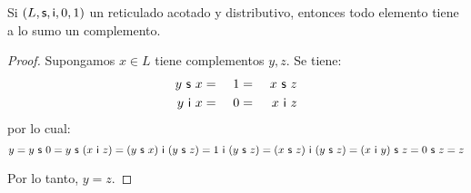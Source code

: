   \begin{lemma} \label{lemma_21}
    \PN Si $(L, \mathsf{s}, \mathsf{i}, 0, 1)$ un reticulado acotado y distributivo, entonces todo elemento tiene a lo sumo un complemento.
  \end{lemma}
  \begin{proof}
    \PN Supongamos $x \in L$ tiene complementos $y, z$. Se tiene:
    \begin{alignat*}{3}
      y \ \mathsf{s} \ x &=& \ 1 &=& \ x \ \mathsf{s} \ z \\
      y \ \mathsf{i} \ x &=& \ 0 &=& \ x \ \mathsf{i} \ z
    \end{alignat*}
    \PN por lo cual:
    \[
      y = y \ \SU \ 0 = y \ \SU \ (x \ \IN \ z) = (y \ \SU \ x) \ \IN \ (y \ \SU \ z) = 1 \ \IN \ (y \ \SU \ z) = (x \
      \SU \ z) \ \IN \ (y \ \SU \ z) = (x \ \IN \ y) \ \SU \ z = 0 \ \SU \ z = z
    \]

    \PN Por lo tanto, $y = z$.
  \end{proof}

